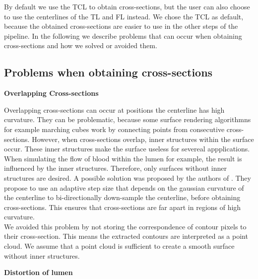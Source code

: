\documentclass[thesis.tex]{subfiles}
\begin{document}
By default we use the TCL to obtain cross-sections, but the user can also choose to use the centerlines of the TL and FL instead. We chose the TCL as default, because the obtained cross-sections are easier to use in the other steps of the pipeline.
In the following we describe problems that can occur when obtaining cross-sections and how we solved or avoided them. 

\subsection{Problems when obtaining cross-sections}

\textbf{Overlapping Cross-sections} 

Overlapping cross-sections can occur at positions the centerline has high curvature. They can be problematic, because some surface rendering algorithmns for example marching cubes work by connecting points from consecutive cross-sections. However, when cross-sections overlap, inner structures within the surface occur. These inner structures make the surface useless for severeal appplications. When simulating the flow of blood within the lumen for example, the result is influenced by the inner structures. Therefore, only surfaces without inner structures are desired. A possible solution was proposed by the authors of \cite{wu2010curvature}. They propose to use an adaptive step size that depends on the gaussian curvature of the centerline to bi-directionally down-sample the centerline, before obtaining cross-sections. This ensures that cross-sections are far apart in regions of high curvature. \\
We avoided this problem by not storing the correspondence of contour pixels to their cross-section. This means the extracted contours are interpreted as a point cloud. We assume that a point cloud is sufficient to create a smooth surface without inner structures.  

\textbf{Distortion of lumen} 
\end{document}
